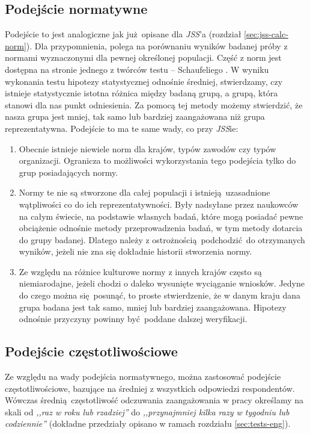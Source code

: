 \subsection{Podejście normatywne}
Podejście to jest analogiczne jak już opisane dla \emph{JSS}'a (rozdział \ref{sec:jss-calc-norm}). Dla przypomnienia, polega na porównaniu wyników badanej próby z normami wyznaczonymi dla pewnej określonej populacji. Część z norm jest dostępna na stronie jednego z twórców testu -- Schaufeliego \cite{web:uwes-norms}. W wyniku wykonania testu hipotezy statystycznej odnośnie średniej, stwierdzamy, czy istnieje statystycznie istotna różnica między badaną grupą, a grupą, która stanowi
dla nas punkt odniesienia. Za pomocą tej metody możemy stwierdzić, że nasza grupa jest mniej, tak samo lub bardziej zaangażowana niż grupa reprezentatywna. Podejście to ma te same wady, co przy \emph{JSS}ie:
\begin{enumerate}
\item Obecnie istnieje niewiele norm dla krajów, typów zawodów czy typów organizacji. Ogranicza to możliwości wykorzystania tego podejścia tylko do grup posiadających normy.
\item Normy te nie są stworzone dla całej populacji i istnieją uzasadnione wątpliwości co do ich reprezentatywności. Były nadsyłane przez naukowców na całym świecie, na podstawie własnych badań, które mogą posiadać pewne obciążenie odnośnie metody przeprowadzenia badań, w tym metody dotarcia do grupy badanej. Dlatego należy z ostrożnością podchodzić do otrzymanych wyników, jeżeli nie zna się dokładnie historii stworzenia normy.
\item Ze względu na różnice kulturowe normy z innych krajów często są niemiarodajne, jeżeli chodzi o daleko wysunięte wyciąganie wniosków. Jedyne do czego można się posunąć, to proste stwierdzenie, że w danym kraju dana grupa badana jest tak samo, mniej lub bardziej zaangażowana. Hipotezy odnośnie przyczyny powinny być poddane dalszej weryfikacji.
\end{enumerate}

\subsection{Podejście częstotliwościowe}
Ze względu na wady podejścia normatywnego, można zastosować podejście częstotliwościowe, bazujące na średniej z wszystkich odpowiedzi respondentów. Wówczas średnią częstotliwość odczuwania zaangażowania w pracy określamy na skali od \textit{,,raz w roku lub rzadziej''} do \textit{,,przynajmniej kilka razy w tygodniu lub codziennie''} (dokładne przedziały opisano w ramach rozdziału \ref{sec:tests-eng}).

